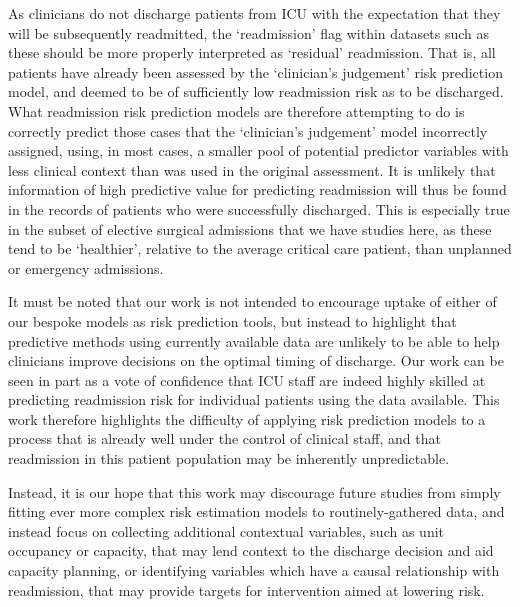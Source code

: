 \documentclass[onecolumn]{article}
\begin{document}
As clinicians do not discharge patients from ICU with the expectation that they will be subsequently readmitted, the `readmission' flag within datasets such as these should be more properly interpreted as `residual' readmission. That is, all patients have already been assessed by the `clinician's judgement' risk prediction model, and deemed to be of sufficiently low readmission risk as to be discharged. What readmission risk prediction models are therefore attempting to do is correctly predict those cases that the `clinician's judgement' model incorrectly assigned, using, in most cases, a smaller pool of potential predictor variables with less clinical context than was used in the original assessment. It is unlikely that information of high predictive value for predicting readmission will thus be found in the records of patients who were successfully discharged. This is especially true in the subset of elective surgical admissions that we have studies here, as these tend to be `healthier', relative to the average critical care patient, than unplanned or emergency admissions.

It must be noted that our work is not intended to encourage uptake of either of our bespoke models as risk prediction tools, but instead to highlight that predictive methods using currently available data are unlikely to be able to help clinicians improve decisions on the optimal timing of discharge. Our work can be seen in part as a vote of confidence that ICU staff are indeed highly skilled at predicting readmission risk for individual patients using the data available. This work therefore highlights the difficulty of applying risk prediction models to a process that is already well under the control of clinical staff, and that readmission in this patient population may be inherently unpredictable. 

Instead, it is our hope that this work may discourage future studies from simply fitting ever more complex risk estimation models to routinely-gathered data, and instead focus on collecting additional contextual variables, such as unit occupancy or capacity, that may lend context to the discharge decision and aid capacity planning, or identifying variables which have a causal relationship with readmission, that may provide targets for intervention aimed at lowering risk.


\begin{multicols}{2}

{\small
}

\end{multicols}
\end{document}
